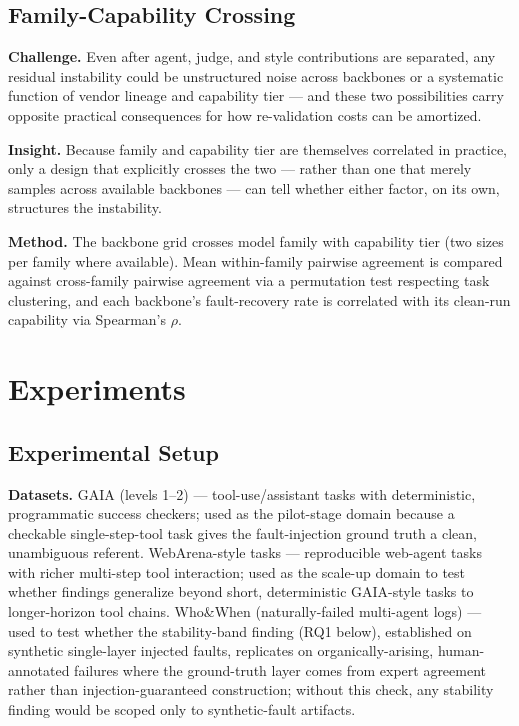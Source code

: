 \documentclass[11pt]{article}
\begin{document}
\subsection{Family-Capability Crossing}
\textbf{Challenge.} Even after agent, judge, and style contributions are separated, any residual instability could be unstructured noise across backbones or a systematic function of vendor lineage and capability tier --- and these two possibilities carry opposite practical consequences for how re-validation costs can be amortized.

\textbf{Insight.} Because family and capability tier are themselves correlated in practice, only a design that explicitly crosses the two --- rather than one that merely samples across available backbones --- can tell whether either factor, on its own, structures the instability.

\textbf{Method.} The backbone grid crosses model family with capability tier (two sizes per family where available). Mean within-family pairwise agreement is compared against cross-family pairwise agreement via a permutation test respecting task clustering, and each backbone's fault-recovery rate is correlated with its clean-run capability via Spearman's $\rho$.

\section{Experiments}

\subsection{Experimental Setup}

\textbf{Datasets.} GAIA (levels 1--2) --- tool-use/assistant tasks with deterministic, programmatic success checkers; used as the pilot-stage domain because a checkable single-step-tool task gives the fault-injection ground truth a clean, unambiguous referent. WebArena-style tasks --- reproducible web-agent tasks with richer multi-step tool interaction; used as the scale-up domain to test whether findings generalize beyond short, deterministic GAIA-style tasks to longer-horizon tool chains. Who\&When \citep{WhoWhen2025} (naturally-failed multi-agent logs) --- used to test whether the stability-band finding (RQ1 below), established on synthetic single-layer injected faults, replicates on organically-arising, human-annotated failures where the ground-truth layer comes from expert agreement rather than injection-guaranteed construction; without this check, any stability finding would be scoped only to synthetic-fault artifacts.
\end{document}
